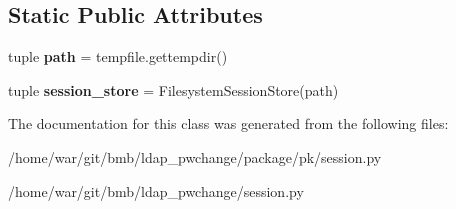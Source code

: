\subsection*{Static Public Attributes}
\begin{DoxyCompactItemize}
\item 
\hypertarget{classsession_1_1SessionStore_a8593aee7fce30397f65ce73af095bc12}{tuple {\bfseries path} = tempfile.\-gettempdir()}\label{classsession_1_1SessionStore_a8593aee7fce30397f65ce73af095bc12}

\item 
\hypertarget{classsession_1_1SessionStore_a066f616244e637822f9687d3e067c715}{tuple {\bfseries session\-\_\-store} = Filesystem\-Session\-Store(path)}\label{classsession_1_1SessionStore_a066f616244e637822f9687d3e067c715}

\end{DoxyCompactItemize}


The documentation for this class was generated from the following files\-:\begin{DoxyCompactItemize}
\item 
/home/war/git/bmb/ldap\-\_\-pwchange/package/pk/session.\-py\item 
/home/war/git/bmb/ldap\-\_\-pwchange/session.\-py\end{DoxyCompactItemize}
